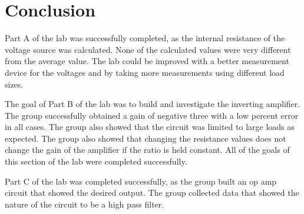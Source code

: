 \documentclass[twocolumn, amsmath]{revtex4}
\begin{document}
\section{Conclusion}
Part A of the lab was successfully completed, as the internal resistance of the voltage source was calculated. None of the calculated values were very different from the average value. The lab could be improved with a better measurement device for the voltages and by taking more measurements using different load sizes.

The goal of Part B of the lab was to build and investigate the inverting amplifier. The group successfully obtained a gain of negative three with a low percent error in all cases. The group also showed that the circuit was limited to large loads as expected. The group also showed that changing the resistance values does not change the gain of the amplifier if the ratio is held constant. All of the goals of this section of the lab were completed successfully.

Part C of the lab was completed successfully, as the group built an op amp circuit that showed the desired output. The group collected data that showed the nature of the circuit to be a high pass filter.
\end{document}
